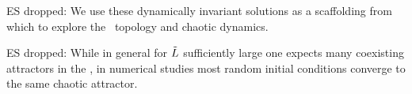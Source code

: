 ES{ dropped: We use these dynamically invariant solutions
as a scaffolding from which to explore the
\statesp\  topology and chaotic dynamics.
}%

ES{ dropped:  While in general
for $\tilde{L}$ sufficiently large
one expects many
coexisting attractors in the \statesp%
,
in numerical studies most random initial
conditions converge to the same chaotic attractor.
}%





%

